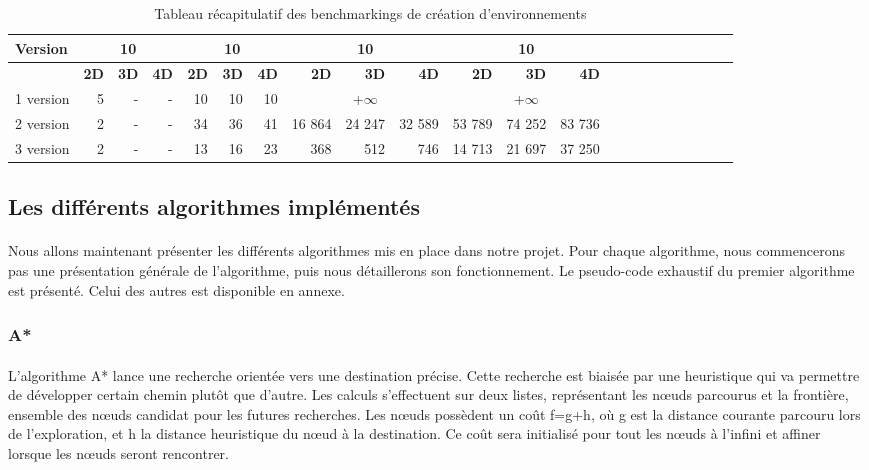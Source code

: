 \documentclass[pidr]{tnreport}
\begin{document}
\begin{table}[h]
\begin{center}
   \begin{tabular}{| l | r | r | r | r | r | r | r | r | r | r | r | r | r | r | r | r | r | r | r | r | r |}
     \hline
      \textbf{Version} & \multicolumn{3}{c|}{\textbf{10\up{2}}} & \multicolumn{3}{c|}{\textbf{10\up{4}}} & \multicolumn{3}{c|}{\textbf{10\up{6}}} & \multicolumn{3}{c|}{\textbf{10\up{7}}} \\
     \hline
     \cline{2-5}
    & \textbf{2D} & \textbf{3D} & \textbf{4D} & \textbf{2D} & \textbf{3D} & \textbf{4D} & \textbf{2D} & \textbf{3D} & \textbf{4D} & \textbf{2D} & \textbf{3D} & \textbf{4D}\\ \hline
     1\up{ère} version & 5 & - & - & ~10\up{7} & ~10\up{8} & ~10\up{8} & \multicolumn{3}{c|}{+$\infty$}  & \multicolumn{3}{c|}{+$\infty$}   \\ \hline
     2\up{ème} version & 2 & - & - & 34 & 36 & 41 & 16 864 & 24 247 & 32 589 & 53 789 & 74 252 & 83 736  \\ \hline
     3\up{ème} version & 2 & - & - & 13 & 16 & 23 & 368 & 512 & 746  & 14 713 & 21 697 & 37 250 \\ \hline
   \end{tabular}
 \end{center}
 \caption{Tableau récapitulatif des benchmarkings de création d'environnements}
\end{table}

	\subsection{Les différents algorithmes implémentés}

\paragraph{}
Nous allons maintenant présenter les différents algorithmes mis en place dans notre projet. Pour chaque algorithme, nous commencerons pas une présentation générale de l'algorithme, puis nous détaillerons son fonctionnement. Le pseudo-code exhaustif du premier algorithme est présenté. Celui des autres est disponible en annexe.
	
\subsubsection{A*}	
\paragraph{}
L'algorithme A* lance une recherche orientée vers une destination précise. Cette recherche est biaisée par une heuristique qui va permettre de développer certain chemin plutôt que d'autre. Les calculs s'effectuent sur deux listes, représentant les nœuds parcourus et la frontière, ensemble des nœuds candidat pour les futures recherches. Les nœuds possèdent un coût f=g+h, où g est la distance courante parcouru lors de l'exploration, et h la distance heuristique du nœud à la destination. Ce coût sera initialisé pour tout les nœuds à l'infini et affiner lorsque les nœuds seront rencontrer. \linebreak
\end{document}
